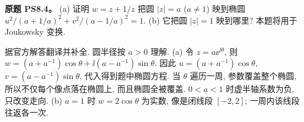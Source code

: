 \begin{exercise}
\textbf{原题 PS8.4。}\label{ass:ps8-4}
(a) 证明 $w=z+1/z$ 把圆 $|z|=a$ ($a\ne1$) 映到椭圆
$u^2/(a+1/a)^2+v^2/(a-1/a)^2=1$.
(b) 它把圆 $|z|=1$ 映到哪里? 本题将用于 Joukowsky 变换.
\end{exercise}
\begin{solution}
据官方解答翻译并补全. 圆半径按 $a>0$ 理解.
(a) 令 $z=a\ee^{\ii\theta}$, 则
$w=(a+a^{-1})\cos\theta+\ii(a-a^{-1})\sin\theta$.
因此 $u=(a+a^{-1})\cos\theta$, $v=(a-a^{-1})\sin\theta$, 代入得到题中椭圆方程. 当 $\theta$ 遍历一周, 参数覆盖整个椭圆, 所以不仅每个像点落在椭圆上, 而且椭圆全被覆盖. $0<a<1$ 时虚半轴系数为负, 只改变走向.
(b) $a=1$ 时 $w=2\cos\theta$ 为实数, 像是闭线段 $[-2,2]$; 一周内该线段往返各一次.
\begin{center}
\end{center}
\end{solution}

